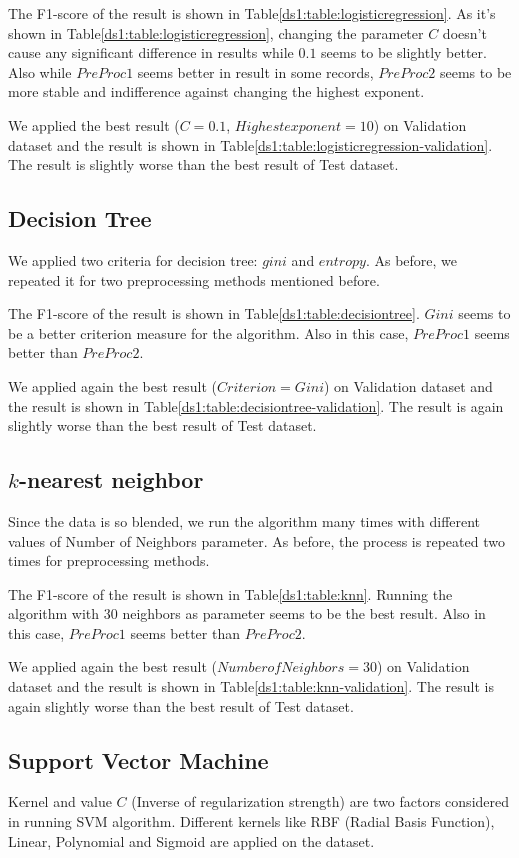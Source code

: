 The F1-score of the result is shown in Table\ref{ds1:table:logisticregression}. As it's shown in Table\ref{ds1:table:logisticregression}, changing the parameter $C$ doesn't cause any significant difference in results while $0.1$ seems to be slightly better. Also while $PreProc1$ seems better in result in some records, $PreProc2$ seems to be more stable and indifference against changing the highest exponent.


We applied the best result ($C=0.1$, $Highest exponent=10$) on Validation dataset and the result is shown in Table\ref{ds1:table:logisticregression-validation}. The result is slightly worse than the best result of Test dataset.


\subsection{Decision Tree}
We applied two criteria for decision tree: $gini$ and $entropy$. As before, we repeated it for two preprocessing methods mentioned before.

The F1-score of the result is shown in Table\ref{ds1:table:decisiontree}. $Gini$ seems to be a better criterion measure for the algorithm. Also in this case, $PreProc1$ seems better than $PreProc2$.

We applied again the best result ($Criterion=Gini$) on Validation dataset and the result is shown in Table\ref{ds1:table:decisiontree-validation}. The result is again slightly worse than the best result of Test dataset.

\subsection{$k$-nearest neighbor}
Since the data is so blended, we run the algorithm many times with different values of Number of Neighbors parameter. As before, the process is repeated two times for preprocessing methods.

The F1-score of the result is shown in Table\ref{ds1:table:knn}. Running the algorithm with $30$ neighbors as parameter seems to be the best result. Also in this case, $PreProc1$ seems better than $PreProc2$.

We applied again the best result ($Number of Neighbors=30$) on Validation dataset and the result is shown in Table\ref{ds1:table:knn-validation}. The result is again slightly worse than the best result of Test dataset.

\subsection{Support Vector Machine}
Kernel and value $C$ (Inverse of regularization strength) are two factors considered in running SVM algorithm. Different kernels like RBF (Radial Basis Function), Linear, Polynomial and Sigmoid are applied on the dataset.

